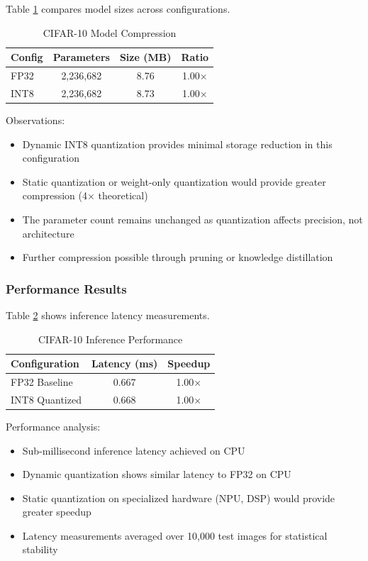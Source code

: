Table \ref{tab:cifar_compression} compares model sizes across configurations.

\begin{table}[h]
\centering
\caption{CIFAR-10 Model Compression}
\label{tab:cifar_compression}
\begin{tabular}{lccc}
\hline
\textbf{Config} & \textbf{Parameters} & \textbf{Size (MB)} & \textbf{Ratio} \\
\hline
FP32 & 2,236,682 & 8.76 & 1.00$\times$ \\
INT8 & 2,236,682 & 8.73 & 1.00$\times$ \\
\hline
\end{tabular}
\end{table}

Observations:
\begin{itemize}
\item Dynamic INT8 quantization provides minimal storage reduction in this configuration
\item Static quantization or weight-only quantization would provide greater compression (4$\times$ theoretical)
\item The parameter count remains unchanged as quantization affects precision, not architecture
\item Further compression possible through pruning or knowledge distillation
\end{itemize}

\subsubsection{Performance Results}

Table \ref{tab:cifar_performance} shows inference latency measurements.

\begin{table}[h]
\centering
\caption{CIFAR-10 Inference Performance}
\label{tab:cifar_performance}
\begin{tabular}{lcc}
\hline
\textbf{Configuration} & \textbf{Latency (ms)} & \textbf{Speedup} \\
\hline
FP32 Baseline & 0.667 & 1.00$\times$ \\
INT8 Quantized & 0.668 & 1.00$\times$ \\
\hline
\end{tabular}
\end{table}

Performance analysis:
\begin{itemize}
\item Sub-millisecond inference latency achieved on CPU
\item Dynamic quantization shows similar latency to FP32 on CPU
\item Static quantization on specialized hardware (NPU, DSP) would provide greater speedup
\item Latency measurements averaged over 10,000 test images for statistical stability
\end{itemize}

